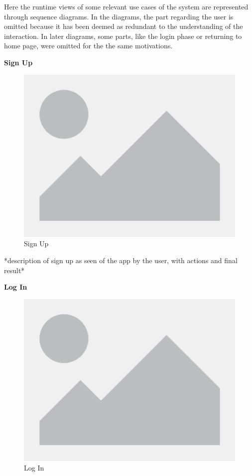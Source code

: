 \documentclass[table, 12pt]{article}
\begin{document}
Here the runtime views of some relevant use cases of the system are represented through sequence diagrams. 
In the diagrams, the part regarding the user is omitted because it has been deemed as redundant to the understanding of the interaction.
In later diagrams, some parts, like the login phase or returning to home page, were omitted for the the same motivations.

\newpage

\textbf{Sign Up}
\begin{center}
    \begin{figure}[H]
        \includegraphics[scale=0.67, center]{assets/placeholder.png}
        \caption{Sign Up}
        \label{fig:signup}
    \end{figure}
\end{center}
*description of sign up as seen of the app by the user, with actions and final result*

\newpage

\textbf{Log In}
\begin{center}
    \begin{figure}[H]
        \includegraphics[scale=0.8, center]{assets/placeholder.png}
        \caption{Log In}
        \label{fig: login}
    \end{figure}
\end{center}
\end{document}
